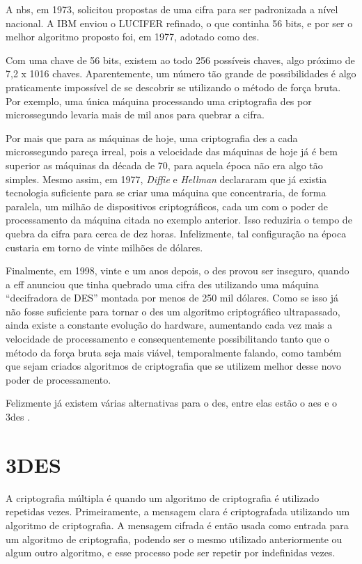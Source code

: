 A \acrfull{nbs}, em 1973, solicitou propostas de uma cifra para ser padronizada a nível nacional. A IBM enviou o LUCIFER refinado, o que continha 56 bits, e por ser o melhor algoritmo proposto foi, em 1977, adotado como \acrfull{des}.

Com uma chave de 56 bits, existem ao todo 256 possíveis chaves, algo próximo de 7,2 x 1016 chaves. Aparentemente, um número tão grande de possibilidades é algo praticamente impossível de se descobrir se utilizando o método de força bruta. Por exemplo, uma única máquina processando uma criptografia \acrshort{des} por microssegundo levaria mais de mil anos para quebrar a cifra.

Por mais que para as máquinas de hoje, uma criptografia \acrshort{des} a cada microssegundo pareça irreal, pois a velocidade das máquinas de hoje já é bem superior as máquinas da década de 70, para aquela época não era algo tão simples. Mesmo assim, em 1977, \textit{Diffie} e \textit{Hellman} declararam que já existia tecnologia suficiente para se criar uma máquina que concentraria, de forma paralela, um milhão de dispositivos criptográficos, cada um com o poder de processamento da máquina citada no exemplo anterior. Isso reduziria o tempo de quebra da cifra para cerca de dez horas. Infelizmente, tal configuração na época custaria em torno de vinte milhões de dólares.

Finalmente, em 1998, vinte e um anos depois, o \acrshort{des} provou ser inseguro, quando a \acrfull{eff} anunciou que tinha quebrado uma cifra \acrshort{des} utilizando uma máquina “decifradora de DES” montada por menos de 250 mil dólares. Como se isso já não fosse suficiente para tornar o \acrshort{des} um algoritmo criptográfico ultrapassado, ainda existe a constante evolução do hardware, aumentando cada vez mais a velocidade de processamento e consequentemente possibilitando tanto que o método da força bruta seja mais viável, temporalmente falando, como também que sejam criados algoritmos de criptografia que se utilizem melhor desse novo poder de processamento.

Felizmente já existem várias alternativas para o \acrshort{des}, entre elas estão o \acrfull{aes} e o \acrfull{3des} \cite{stallings14}.

\section{3DES}
\label{sec:3des}
A criptografia múltipla é quando um algoritmo de criptografia é utilizado repetidas vezes. Primeiramente, a mensagem clara é criptografada utilizando um algoritmo de criptografia. A mensagem cifrada é então usada como entrada para um algoritmo de criptografia, podendo ser o mesmo utilizado anteriormente ou algum outro algoritmo, e esse processo pode ser repetir por indefinidas vezes.

